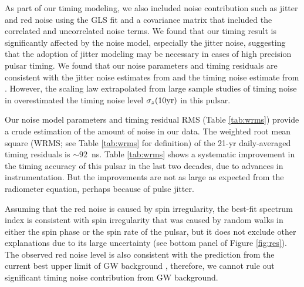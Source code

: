 As part of our timing modeling, we also included noise contribution
such as jitter and red noise
 using the GLS fit and a covariance matrix that included the
correlated and uncorrelated noise terms.
We found that our timing result is significantly affected by the noise
model, especially the jitter noise, suggesting that the adoption of jitter
modeling may be necessary in cases of high precision pulsar timing. 
We found that our noise parameters and timing residuals are consistent with the jitter
noise estimates from \citet{sc12} and the timing noise estimate from \citet{sc10}. However,
the scaling law extrapolated from large sample studies of timing noise in \citet{hlk10}
overestimated the timing noise level $\sigma_z({\rm 10 yr})$ in this pulsar.

Our noise model parameters and timing residual RMS (Table \ref{tab:wrms})
provide a crude estimation of the amount of noise in our data. The weighted
root mean square (WRMS; see Table \ref{tab:wrms} for definition) of
the 21-yr daily-averaged timing residuals is $\sim 92$~ns. 
Table \ref{tab:wrms} shows a systematic improvement in the timing accuracy of
this pulsar in the last two decades, due to advances in instrumentation.
But the improvements are not as large as expected from the radiometer 
equation, perhaps because of pulse jitter. 

Assuming that the red noise is caused by spin irregularity,
the best-fit spectrum index is consistent with
spin irregularity that was caused by random walks in
either the spin phase or the spin rate of the pulsar, but it does not exclude other explanations
due to its large uncertainty (see bottom panel of Figure \ref{fig:res}).
The observed red noise level is also consistent with the prediction
from the current best upper limit of GW background \citep{src+13}, therefore,
we cannot rule out significant timing noise contribution from GW background. 


